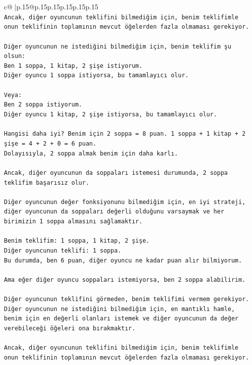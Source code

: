 \documentclass{article}
\begin{document}
{\begin{supertabular}{c@{$\;$}|p{.15\linewidth}@{}p{.15\linewidth}p{.15\linewidth}p{.15\linewidth}p{.15\linewidth}p{.15\linewidth}}
{{{\\ 
\texttt{Ancak, diğer oyuncunun teklifini bilmediğim için, benim teklifimle onun teklifinin toplamının mevcut öğelerden fazla olmaması gerekiyor.} \\
\\ 
\texttt{Diğer oyuncunun ne istediğini bilmediğim için, benim teklifim şu olsun:} \\
\texttt{Ben 1 soppa, 1 kitap, 2 şişe istiyorum.} \\
\texttt{Diğer oyuncu 1 soppa istiyorsa, bu tamamlayıcı olur.} \\
\\ 
\texttt{Veya:} \\
\texttt{Ben 2 soppa istiyorum.} \\
\texttt{Diğer oyuncu 1 kitap, 2 şişe istiyorsa, bu tamamlayıcı olur.} \\
\\ 
\texttt{Hangisi daha iyi? Benim için 2 soppa = 8 puan. 1 soppa + 1 kitap + 2 şişe = 4 + 2 + 0 = 6 puan.} \\
\texttt{Dolayısıyla, 2 soppa almak benim için daha karlı.} \\
\\ 
\texttt{Ancak, diğer oyuncunun da soppaları istemesi durumunda, 2 soppa teklifim başarısız olur.} \\
\\ 
\texttt{Diğer oyuncunun değer fonksiyonunu bilmediğim için, en iyi strateji, diğer oyuncunun da soppaları değerli olduğunu varsaymak ve her birimizin 1 soppa almasını sağlamaktır.} \\
\\ 
\texttt{Benim teklifim: 1 soppa, 1 kitap, 2 şişe.} \\
\texttt{Diğer oyuncunun teklifi: 1 soppa.} \\
\texttt{Bu durumda, ben 6 puan, diğer oyuncu ne kadar puan alır bilmiyorum.} \\
\\ 
\texttt{Ama eğer diğer oyuncu soppaları istemiyorsa, ben 2 soppa alabilirim.} \\
\\ 
\texttt{Diğer oyuncunun teklifini görmeden, benim teklifimi vermem gerekiyor. Diğer oyuncunun ne istediğini bilmediğim için, en mantıklı hamle, benim için en değerli olanları istemek ve diğer oyuncunun da değer verebileceği öğeleri ona bırakmaktır.} \\
\\ 
\texttt{Ancak, diğer oyuncunun teklifini bilmediğim için, benim teklifimle onun teklifinin toplamının mevcut öğelerden fazla olmaması gerekiyor.} \\
}}}
\end{supertabular}}
\end{document}
